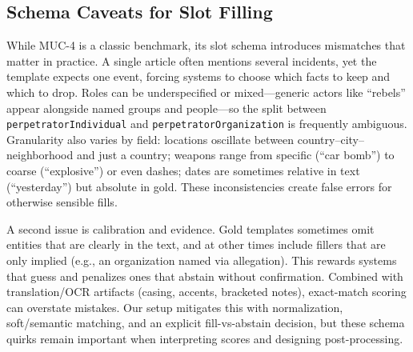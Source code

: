 \subsection{Schema Caveats for Slot Filling}

While MUC-4 is a classic benchmark, its slot schema introduces mismatches that matter in practice. A single article often mentions several incidents, yet the template expects one event, forcing systems to choose which facts to keep and which to drop. Roles can be underspecified or mixed—generic actors like “rebels” appear alongside named groups and people—so the split between \texttt{perpetratorIndividual} and \texttt{perpetratorOrganization} is frequently ambiguous. Granularity also varies by field: locations oscillate between country–city–neighborhood and just a country; weapons range from specific (“car bomb”) to coarse (“explosive”) or even dashes; dates are sometimes relative in text (“yesterday”) but absolute in gold. These inconsistencies create false errors for otherwise sensible fills.

A second issue is calibration and evidence. Gold templates sometimes omit entities that are clearly in the text, and at other times include fillers that are only implied (e.g., an organization named via allegation). This rewards systems that guess and penalizes ones that abstain without confirmation. Combined with translation/OCR artifacts (casing, accents, bracketed notes), exact-match scoring can overstate mistakes. Our setup mitigates this with normalization, soft/semantic matching, and an explicit fill-vs-abstain decision, but these schema quirks remain important when interpreting scores and designing post-processing.
